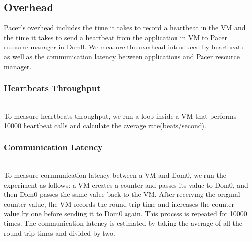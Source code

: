 




\subsection{Overhead}

Pacer's overhead includes the time it takes to record a heartbeat in the VM and the time it takes to send a heartbeat from the application in VM to Pacer resource manager in Dom0. We measure the overhead introduced by heartbeats as well as the communication latency between applications and Pacer resource manager. 

\subsubsection*{Heartbeats Throughput}\hfill\\
\indent To measure heartbeats throughput, we run a loop inside a VM that performs 10000 heartbeat calls and calculate the average rate(beats/second). 
\subsubsection*{Communication Latency}\hfill\\
\indent To measure communication latency between a VM and Dom0, we run the experiment as follows: a VM creates a counter and passes its value to Dom0, and then Dom0 passes the same value back to the VM. After receiving the original counter value, the VM records the round trip time and increases the counter value by one before sending it to Dom0 again. This process is repeated for 10000 times. The communication latency is estimated by taking the average of all the round trip times and divided by two. 


